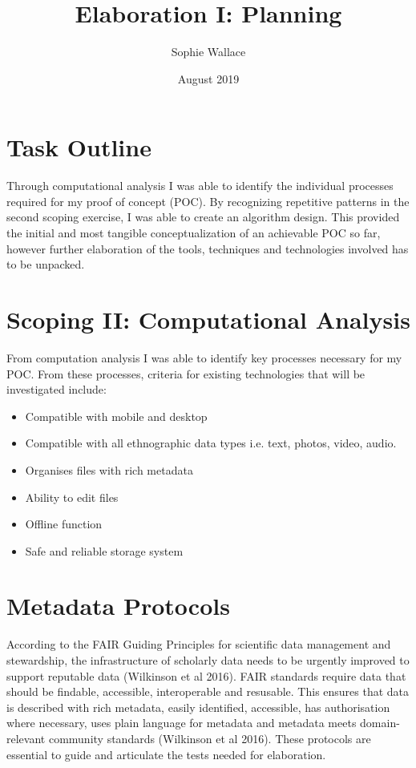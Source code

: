 \documentclass{article}
\title{Elaboration I: Planning}
\author{Sophie Wallace }
\date{August 2019}
\begin{document}
\maketitle

\tableofcontents
\clearpage

\section{Task Outline}
Through computational analysis I was able to identify the individual processes required for my proof of concept (POC). By recognizing repetitive patterns in the second scoping exercise, I was able to create an algorithm design. This provided the initial and most tangible conceptualization of an achievable POC so far, however further elaboration of the tools, techniques and technologies involved has to be unpacked.

\section{Scoping II: Computational Analysis}
From computation analysis I was able to identify key processes necessary for my POC. From these processes, criteria for existing technologies that will be investigated include:

\begin{itemize}
\item Compatible with mobile and desktop
\item Compatible with all ethnographic data types i.e. text, photos, video, audio.
\item Organises files with rich metadata
\item Ability to edit files
\item Offline function 
\item Safe and reliable storage system
\end{itemize}


\section{Metadata Protocols}
According to the FAIR Guiding Principles for scientific data management and stewardship, the infrastructure of scholarly data needs to be urgently improved to support reputable data (Wilkinson et al 2016). FAIR standards require data that should be findable, accessible, interoperable and resusable. This ensures that data is described with rich metadata, easily identified, accessible, has authorisation where necessary, uses plain language for metadata and metadata meets domain-relevant community standards (Wilkinson et al 2016). These protocols are essential to guide and articulate the tests needed for elaboration. 
\end{document}
